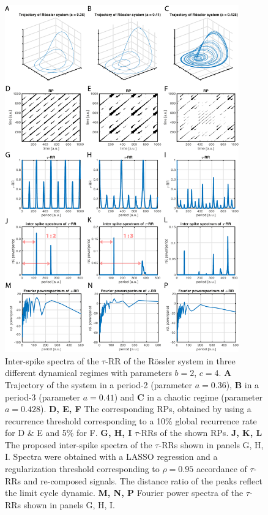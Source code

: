 \documentclass[entropy,article,submit,pdftex,moreauthors]{Definitions/mdpi}
\begin{document}
\begin{figure}
 \centering
 \includegraphics[width=0.9\textwidth]{./figures/fig_tau_rr_example_roessler}
 \caption{Inter-spike spectra of the $\tau$-RR of the R\"ossler system in three different dynamical regimes with parameters $b=2$, $c=4$. 
 \textbf{A} Trajectory of the system in a period-2 (parameter $a=0.36$), \textbf{B} in a period-3 (parameter $a=0.41$) and 
 \textbf{C} in a chaotic regime (parameter $a=0.428$). 
 \textbf{D, E, F} The corresponding RPs, obtained by using a recurrence threshold corresponding to a 10\% global 
 recurrence rate for D \& E and 5\% for F. 
  \textbf{G, H, I} $\tau$-RRs of the shown RPs. 
  \textbf{J, K, L} The proposed inter-spike spectra of the $\tau$-RRs shown in panels G, H, I. Spectra were obtained with a LASSO regression and a regularization threshold 
  corresponding to $\rho=0.95$ accordance of $\tau$-RRs and re-composed signals. The distance ratio of the peaks reflect the limit cycle dynamic.  
  \textbf{M, N, P} Fourier power spectra of the $\tau$-RRs shown in panels G, H, I. }
\label{fig_tau_rr_example_roessler}
\end{figure}
\end{document}
